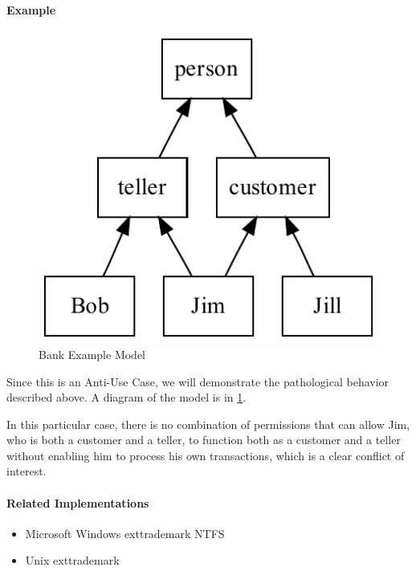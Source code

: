 \paragraph{Example}

\begin{figure}[t]
        \begin{center}\includegraphics[width=\myfigwidth,height=\myfigheight,keepaspectratio]{figs/dot/bank_model}\end{center}
        \caption{Bank Example Model}\label{fig:perm-flat}
\end{figure}

Since this is an Anti-Use Case, we will demonstrate the pathological behavior described above.  A diagram of the model is in \ref{fig:perm-flat}.

In this particular case, there is no combination of permissions that can allow Jim, who is both a customer and a teller, to function both as a customer and a teller without enabling him to process his own transactions, which is a clear conflict of interest.

\paragraph{Related Implementations}

\begin{itemize}
        \item Microsoft Windows        exttrademark NTFS
        \item Unix        exttrademark
\end{itemize}

